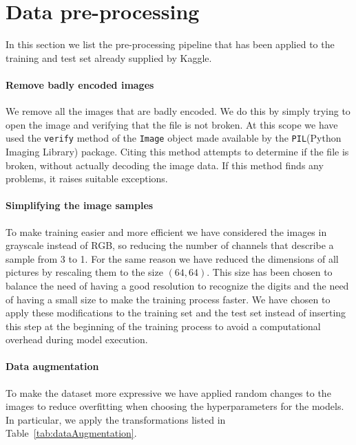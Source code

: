 \section{Data pre-processing}\label{1_preProcessing}
In this section we list the pre-processing pipeline that has been applied to the training and test set already supplied by Kaggle.

\paragraph{Remove badly encoded images}
We remove all the images that are badly encoded. We do this by simply trying to open the image and verifying that the file is not broken. At this scope we have used the \texttt{verify} method of the \texttt{Image} object made available by the \texttt{PIL}(Python Imaging Library) package. Citing  this method attempts to determine if the file is broken, without actually decoding the image data. If this method finds any problems, it raises suitable exceptions\cite{PILImageverify}.

\paragraph{Simplifying the image samples}
To make training easier and more efficient we have considered the images in grayscale instead of RGB, so reducing the number of channels that describe a sample from 3 to 1. For the same reason we have reduced the dimensions of all pictures by rescaling them to the size $\left(64,64\right)$. This size has been chosen to balance the need of having a good resolution to recognize the digits and the need of having a small size to make the training process faster. We have chosen to apply these modifications to the training set and the test set instead of inserting this step at the beginning of the training process to avoid a computational overhead during model execution.

\paragraph{Data augmentation}
To make the dataset more expressive we have applied random changes to the images to reduce overfitting when choosing the hyperparameters for the models. In particular, we apply the transformations listed in Table~\ref{tab:dataAugmentation}.

